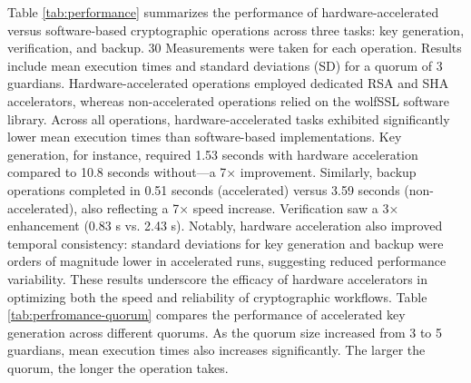 Table \ref{tab:performance} summarizes the performance of hardware-accelerated versus software-based cryptographic operations across three tasks: key generation, verification, and backup. 30 Measurements were taken for each operation. Results include mean execution times and standard deviations (SD) for a quorum of 3 guardians. Hardware-accelerated operations employed dedicated RSA and SHA accelerators, whereas non-accelerated operations relied on the wolfSSL software library. Across all operations, hardware-accelerated tasks exhibited significantly lower mean execution times than software-based implementations. Key generation, for instance, required 1.53 seconds with hardware acceleration compared to 10.8 seconds without—a 7× improvement. Similarly, backup operations completed in 0.51 seconds (accelerated) versus 3.59 seconds (non-accelerated), also reflecting a 7× speed increase. Verification saw a 3× enhancement (0.83 s vs. 2.43 s). Notably, hardware acceleration also improved temporal consistency: standard deviations for key generation and backup were orders of magnitude lower in accelerated runs, suggesting reduced performance variability. These results underscore the efficacy of hardware accelerators in optimizing both the speed and reliability of cryptographic workflows.  Table \ref{tab:perfromance-quorum} compares the performance of accelerated key generation across different quorums. As the quorum size increased from 3 to 5 guardians, mean execution times also increases significantly. The larger the quorum, the longer the operation takes.

